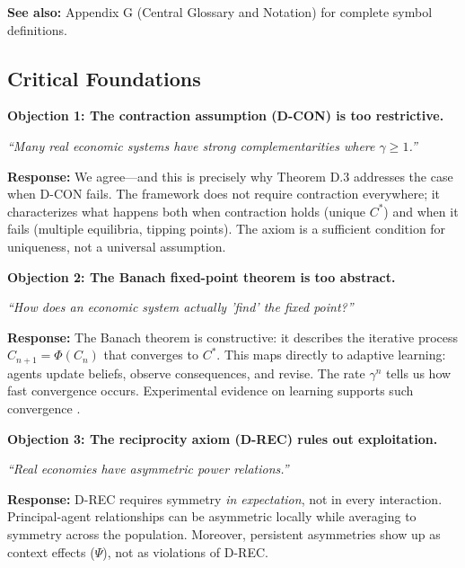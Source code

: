 \textbf{See also:} Appendix G (Central Glossary and Notation) for complete symbol definitions.


\subsection{Critical Foundations}
\label{sec:D-foundations}

\begin{tcolorbox}[colback=red!5!white, colframe=red!75!black,
    title=\textbf{Critical Foundations: Objections and Responses}]

\textbf{Objection 1: The contraction assumption (D-CON) is too restrictive.}

\textit{``Many real economic systems have strong complementarities where $\gamma \geq 1$.''}

\textbf{Response:} We agree---and this is precisely why Theorem D.3 addresses the
case when D-CON fails. The framework does not require contraction everywhere;
it characterizes what happens both when contraction holds (unique $C^*$) and
when it fails (multiple equilibria, tipping points). The axiom is a sufficient
condition for uniqueness, not a universal assumption.

\medskip

\textbf{Objection 2: The Banach fixed-point theorem is too abstract.}

\textit{``How does an economic system actually 'find' the fixed point?''}

\textbf{Response:} The Banach theorem is constructive: it describes the iterative
process $C_{n+1} = \Phi(C_n)$ that converges to $C^*$. This maps directly to
adaptive learning: agents update beliefs, observe consequences, and revise.
The rate $\gamma^n$ tells us how fast convergence occurs. Experimental evidence
on learning supports such convergence \citep{PAP-camerer2003behavioral}.

\medskip

\textbf{Objection 3: The reciprocity axiom (D-REC) rules out exploitation.}

\textit{``Real economies have asymmetric power relations.''}

\textbf{Response:} D-REC requires symmetry \emph{in expectation}, not in every
interaction. Principal-agent relationships can be asymmetric locally while
averaging to symmetry across the population. Moreover, persistent asymmetries
show up as context effects ($\Psi$), not as violations of D-REC.


\end{tcolorbox}

